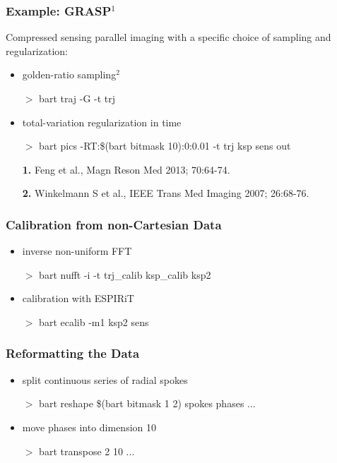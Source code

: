 \documentclass{beamer}
\begin{document}
\begin{frame}
\frametitle{Example: GRASP$^1$}

Compressed sensing parallel imaging with a
specific choice of sampling and regularization:
\vspace{0.3cm}
\begin{itemize}
\item {\color{red}golden-ratio sampling$^2$}
\item[$>$] bart {\color{red}traj -G -t trj}
\vspace{0.3cm}
\item {\color{yellow}total-variation regularization} in {\color{blue}time}
\item[$>$] bart pics  -R{\color{yellow}T}:{\color{blue}\$(bart bitmask 10)}:0:{\color{pink}0.01}  {\color{red}-t trj} ksp {\color{green}sens} out
\end{itemize}



\vfill
{\tiny
\begin{itemize}
\item[] {\bf 1.} Feng et al., Magn Reson Med 2013; 70:64-74.
\item[] {\bf 2.} Winkelmann S et al., IEEE Trans Med Imaging 2007; 26:68-76.
\end{itemize}
}

\end{frame}




\begin{frame}
\frametitle{Calibration from non-Cartesian Data}

\begin{itemize}
\item inverse {\color{red}non-uniform} FFT 
\item[$>$] bart {\color{red} nufft -i -t trj\_calib} ksp\_calib ksp2
\vspace{0.2cm}
\item {\color{green}calibration with ESPIRiT}
\item[$>$] bart {\color{green}ecalib -m1} ksp2 {\color{green}sens}
\end{itemize}

\end{frame}


\begin{frame}
\frametitle{Reformatting the Data}

\begin{itemize}
\item split continuous series of radial spokes 
\item[$>$] bart reshape \$(bart bitmask 1 2) spokes phases ...
\vspace{0.2cm}
\item move phases into dimension 10
\item[$>$] bart transpose 2 10 ...
\end{itemize}


\end{frame}
\end{document}
